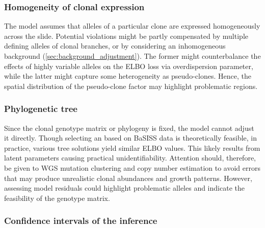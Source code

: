 \subsubsection*{Homogeneity of clonal expression}
The model assumes that alleles of a particular clone are expressed homogeneously across the slide. Potential violations might be partly compensated by multiple defining alleles of clonal branches, or by considering an inhomogeneous background (\cref{sec:background_adjustment}). The former might counterbalance the effects of highly variable alleles on the \ac{ELBO} loss via overdispersion parameter, while the latter might capture some heterogeneity as pseudo-clones. Hence, the spatial distribution of the pseudo-clone factor may highlight problematic regions. 

\subsubsection*{Phylogenetic tree}
Since the clonal genotype matrix or phylogeny is fixed, the model cannot adjust it directly. Though selecting an  based on BaSISS data is theoretically feasible, in practice, various tree solutions yield similar \ac{ELBO} values. This likely results from latent parameters causing practical unidentifiability. Attention should, therefore, be given to \ac{WGS} mutation clustering and copy number estimation to avoid errors that may produce unrealistic clonal abundances and growth patterns. However, assessing model residuals could highlight problematic alleles and indicate the feasibility of the genotype matrix.

\subsubsection*{Confidence intervals of the inference}

